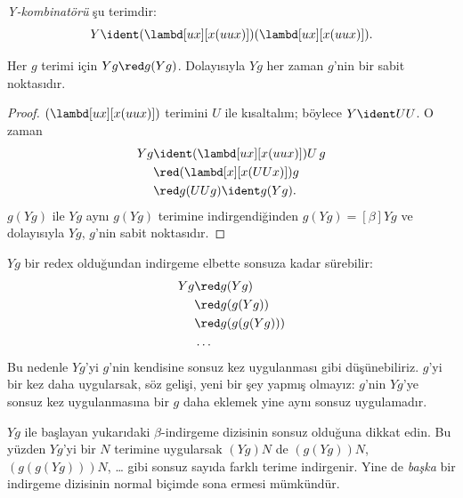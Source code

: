 \documentclass[../../../include/open-logic-section]{subfiles}
\begin{document}
\begin{defn}
  \emph{Y-kombinatörü} şu terimdir:
  \[
  Y \ident (\lambd[ux][x(uux)])(\lambd[ux][x(uux)]).
  \]
\end{defn}

\begin{thm}
  Her $g$ terimi için $Yg\red g(Yg)$. Dolayısıyla $Yg$ her zaman $g$'nin
  bir sabit noktasıdır.
\end{thm}

\begin{proof}
  $(\lambd[ux][x(uux)])$ terimini $U$ ile kısaltalım; böylece $Y\ident UU$.
  O zaman
  \begin{align*}
    Y g &\ident (\lambd[ux][x(uux)])U\,g \\
    &\red (\lambd[x][x(UUx)])g\\
    & \red g(UUg) \ident g(Yg).
  \end{align*}
  $g(Yg)$ ile $Yg$ aynı $g(Yg)$ terimine indirgendiğinden
  $g(Yg)\equal[\beta]Yg$ ve dolayısıyla $Yg$, $g$'nin sabit noktasıdır.
\end{proof}

$Yg$ bir redex olduğundan indirgeme elbette sonsuza kadar sürebilir:
\begin{align*}
  Y g &\red g (Y g) \\
    &\red g (g (Y g)) \\
    &\red g(g (g (Y g)))\\
    &\ldots
\end{align*}
Bu nedenle $Yg$'yi $g$'nin kendisine sonsuz kez uygulanması gibi
düşünebiliriz. $g$'yi bir kez daha uygularsak, söz gelişi, yeni bir şey
yapmış olmayız: $g$'nin $Yg$'ye sonsuz kez uygulanmasına bir $g$ daha eklemek
yine aynı sonsuz uygulamadır.

$Yg$ ile başlayan yukarıdaki $\beta$-indirgeme dizisinin sonsuz olduğuna
dikkat edin. Bu yüzden $Yg$'yi bir $N$ terimine uygularsak $(Yg)N$ de
$(g(Yg))N$, $(g(g(Yg)))N$, \dots{} gibi sonsuz sayıda farklı terime
indirgenir. Yine de \emph{başka} bir indirgeme dizisinin normal biçimde sona
ermesi mümkündür.
\end{document}
